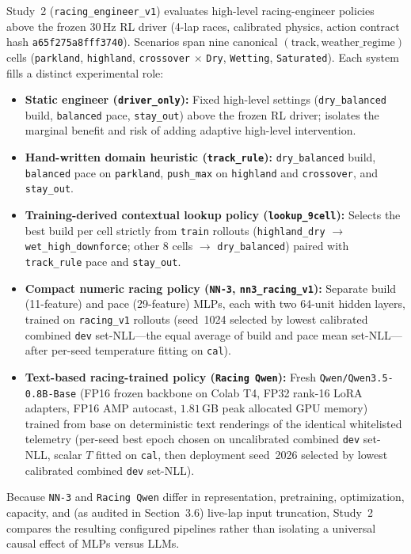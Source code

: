 \documentclass[11pt,a4paper]{article}
\begin{document}
Study~2 (\texttt{racing\_engineer\_v1}) evaluates high-level racing-engineer policies above the frozen 30\,Hz RL driver (4-lap races, calibrated physics, action contract hash \texttt{a65f275a8fff3740}). Scenarios span nine canonical $(\text{track}, \text{weather\_regime})$ cells (\texttt{parkland}, \texttt{highland}, \texttt{crossover} $\times$ \texttt{Dry}, \texttt{Wetting}, \texttt{Saturated}). Each system fills a distinct experimental role:
\begin{itemize}[leftmargin=1.5em,itemsep=2pt]
  \item \textbf{Static engineer (\texttt{driver\_only}):} Fixed high-level settings (\texttt{dry\_balanced} build, \texttt{balanced} pace, \texttt{stay\_out}) above the frozen RL driver; isolates the marginal benefit and risk of adding adaptive high-level intervention.
  \item \textbf{Hand-written domain heuristic (\texttt{track\_rule}):} \texttt{dry\_balanced} build, \texttt{balanced} pace on \texttt{parkland}, \texttt{push\_max} on \texttt{highland} and \texttt{crossover}, and \texttt{stay\_out}.
  \item \textbf{Training-derived contextual lookup policy (\texttt{lookup\_9cell}):} Selects the best build per cell strictly from \texttt{train} rollouts (\texttt{highland\_dry} $\rightarrow$ \texttt{wet\_high\_downforce}; other 8 cells $\rightarrow$ \texttt{dry\_balanced}) paired with \texttt{track\_rule} pace and \texttt{stay\_out}.
  \item \textbf{Compact numeric racing policy (\texttt{NN-3}, \texttt{nn3\_racing\_v1}):} Separate build (11-feature) and pace (29-feature) MLPs, each with two 64-unit hidden layers, trained on \texttt{racing\_v1} rollouts (seed~1024 selected by lowest calibrated combined \texttt{dev} set-NLL---the equal average of build and pace mean set-NLL---after per-seed temperature fitting on \texttt{cal}).
  \item \textbf{Text-based racing-trained policy (\texttt{Racing Qwen}):} Fresh \texttt{Qwen/Qwen3.5-0.8B-Base} (FP16 frozen backbone on Colab T4, FP32 rank-16 LoRA adapters, FP16 AMP autocast, $1.81$\,GB peak allocated GPU memory) trained from base on deterministic text renderings of the identical whitelisted telemetry (per-seed best epoch chosen on uncalibrated combined \texttt{dev} set-NLL, scalar $T$ fitted on \texttt{cal}, then deployment seed~2026 selected by lowest calibrated combined \texttt{dev} set-NLL).
\end{itemize}
Because \texttt{NN-3} and \texttt{Racing Qwen} differ in representation, pretraining, optimization, capacity, and (as audited in Section~3.6) live-lap input truncation, Study~2 compares the resulting configured pipelines rather than isolating a universal causal effect of MLPs versus LLMs.
\end{document}
